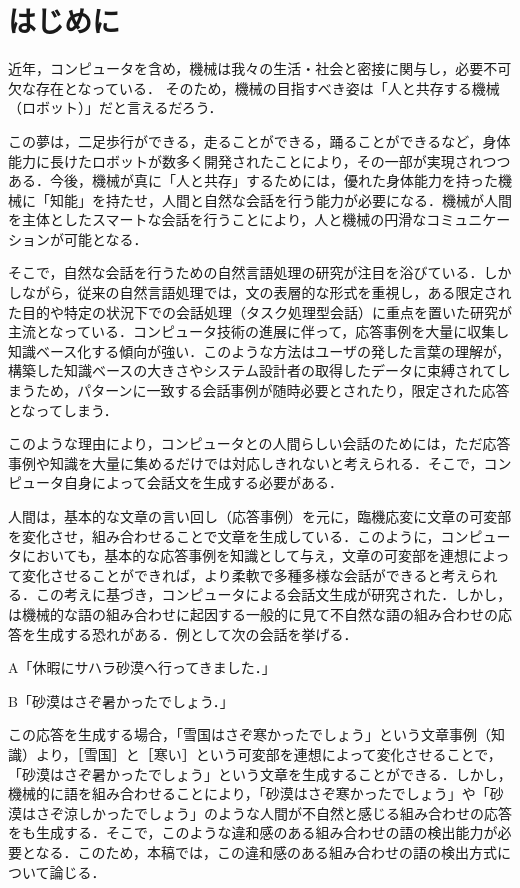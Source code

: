 \documentclass[japanese]{jnlp_1.4}
\begin{document}
\maketitle


\section{はじめに}
近年，コンピュータを含め，機械は我々の生活・社会と密接に関与し，必要不可欠な存在となっている． そのため，機械の目指すべき姿は「人と共存する機械（ロボット）」だと言えるだろう．

この夢は，二足歩行ができる，走ることができる，踊ることができるなど，身体能力に長けたロボット\cite{HumanRobot1999}\cite{RoBolution2001}が数多く開発されたことにより，その一部が実現されつつある．今後，機械が真に「人と共存」するためには，優れた身体能力を持った機械に「知能」を持たせ，人間と自然な会話を行う能力が必要になる．機械が人間を主体としたスマートな会話を行うことにより，人と機械の円滑なコミュニケーションが可能となる．

そこで，自然な会話を行うための自然言語処理の研究が注目を浴びている．しかしながら，従来の自然言語処理では，文の表層的な形式を重視し，ある限定された目的や特定の状況下での会話処理（タスク処理型会話）に重点を置いた研究が主流となっている．コンピュータ技術の進展に伴って，応答事例を大量に収集し知識ベース化する傾向が強い．このような方法はユーザの発した言葉の理解が，構築した知識ベースの大きさやシステム設計者の取得したデータに束縛されてしまうため，パターンに一致する会話事例が随時必要とされたり，限定された応答となってしまう．

このような理由により，コンピュータとの人間らしい会話のためには，ただ応答事例や知識を大量に集めるだけでは対応しきれないと考えられる．そこで，コンピュータ自身によって会話文を生成する必要がある．

人間は，基本的な文章の言い回し（応答事例）を元に，臨機応変に文章の可変部を変化させ，組み合わせることで文章を生成している．このように，コンピュータにおいても，基本的な応答事例を知識として与え，文章の可変部を連想によって変化させることができれば，より柔軟で多種多様な会話ができると考えられる．この考えに基づき，コンピュータによる会話文生成\cite{Yoshimura2006}が研究された．しかし，\cite{Yoshimura2006}は機械的な語の組み合わせに起因する一般的に見て不自然な語の組み合わせの応答を生成する恐れがある．例として次の会話を挙げる．

A「休暇にサハラ砂漠へ行ってきました．」

B「砂漠はさぞ暑かったでしょう．」

\noindent
この応答を生成する場合，「雪国はさぞ寒かったでしょう」という文章事例（知識）より，［雪国］と［寒い］という可変部を連想によって変化させることで，「砂漠はさぞ暑かったでしょう」という文章を生成することができる．しかし，機械的に語を組み合わせることにより，「砂漠はさぞ寒かったでしょう」や「砂漠はさぞ涼しかったでしょう」のような人間が不自然と感じる組み合わせの応答をも生成する．そこで，このような違和感のある組み合わせの語の検出能力が必要となる．このため，本稿では，この違和感のある組み合わせの語の検出方式について論じる．
\end{document}

